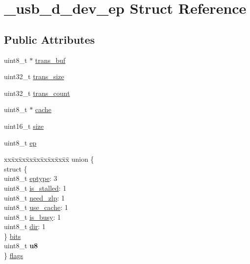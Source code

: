 \hypertarget{struct__usb__d__dev__ep}{}\section{\+\_\+usb\+\_\+d\+\_\+dev\+\_\+ep Struct Reference}
\label{struct__usb__d__dev__ep}
\subsection*{Public Attributes}
\begin{DoxyCompactItemize}
\item 
uint8\+\_\+t $\ast$ \hyperlink{struct__usb__d__dev__ep_ae92c765b2fa69c10f3ecfad197f02b58}{trans\+\_\+buf}
\item 
uint32\+\_\+t \hyperlink{struct__usb__d__dev__ep_afb1bb784ecb141ded602492986c9b143}{trans\+\_\+size}
\item 
uint32\+\_\+t \hyperlink{struct__usb__d__dev__ep_a5a93b9e40a4c898719b68e57cd7dab12}{trans\+\_\+count}
\item 
uint8\+\_\+t $\ast$ \hyperlink{struct__usb__d__dev__ep_a2d47ba0250abeb90f53fa6dbde19b064}{cache}
\item 
uint16\+\_\+t \hyperlink{struct__usb__d__dev__ep_ab9b9e7226ec2d279c5c15385120bfafe}{size}
\item 
uint8\+\_\+t \hyperlink{struct__usb__d__dev__ep_af7f394dcca24e4e6db6f2cc59daa2647}{ep}
\item 
\begin{tabbing}
xx\=xx\=xx\=xx\=xx\=xx\=xx\=xx\=xx\=\kill
union \{\\
\>struct \{\\
\>\>uint8\_t \hyperlink{struct__usb__d__dev__ep_aec515d494d17a7912a0c5b303e4c1696}{eptype}: 3\\
\>\>uint8\_t \hyperlink{struct__usb__d__dev__ep_a2fff80c2f9b61f264ab4b85c88f6a477}{is\_stalled}: 1\\
\>\>uint8\_t \hyperlink{struct__usb__d__dev__ep_af8226dd30729290d5959f410fb2b90b4}{need\_zlp}: 1\\
\>\>uint8\_t \hyperlink{struct__usb__d__dev__ep_a28ed1e059170e6614ceaa07a1e0a408c}{use\_cache}: 1\\
\>\>uint8\_t \hyperlink{struct__usb__d__dev__ep_a108475bc1f0f9a01337b2c6d3f109491}{is\_busy}: 1\\
\>\>uint8\_t \hyperlink{struct__usb__d__dev__ep_a1edae238e40b7419da0d0feed2b6c16b}{dir}: 1\\
\>\} \hyperlink{struct__usb__d__dev__ep_aa7295c7077ef0b40927462e4c32a85c4}{bits}\\
\>uint8\_t {\bfseries u8}\\
\} \hyperlink{struct__usb__d__dev__ep_adc7a500f14196d3bc35ef8a3c2424119}{flags}\\

\end{tabbing}\end{DoxyCompactItemize}


